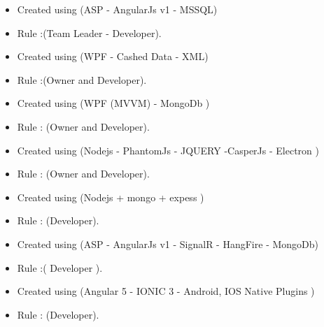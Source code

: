 \documentclass[10pt,a4paper]{altacv}
\begin{document}
\begin{itemize}
\item Created using (ASP - AngularJs v1 - MSSQL) 
\item Rule :(Team Leader - Developer). 
\end{itemize}
\divider

 \begin{itemize}
\item Created using (WPF - Cashed Data - XML) 
\item Rule :(Owner and Developer). 
\end{itemize}
 \divider

  \begin{itemize}
\item Created using (WPF (MVVM) - MongoDb ) 
\item Rule : (Owner and Developer). 
\end{itemize}

 \divider

  \begin{itemize}
\item Created using (Nodejs - PhantomJs - JQUERY -CasperJs - Electron ) 
\item Rule : (Owner and Developer). 
\end{itemize}

 \divider
\clearpage
 
 
  \divider
  \begin{itemize}
\item Created using (Nodejs + mongo + expess ) 
\item Rule : (Developer). 
\end{itemize}

\divider
{}
  \begin{itemize}
\item Created using (ASP - AngularJs v1 - SignalR - HangFire - MongoDb) 
\item Rule :( Developer ). 
\end{itemize}
\medskip
 \divider
{}
  \begin{itemize}
\item Created using (Angular 5  - IONIC 3 - Android, IOS Native Plugins ) 
\item Rule : (Developer). 
\end{itemize}
\end{document}
